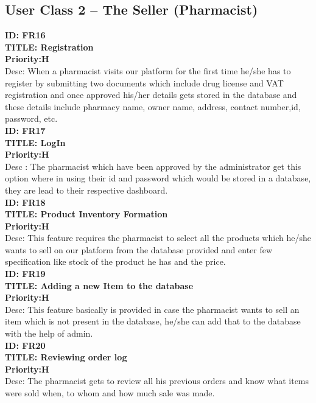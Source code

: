 \documentclass{scrreprt}
\begin{document}
\subsection{User Class 2 – The Seller (Pharmacist)}  

 
 \textbf{ID: FR16}\\
 \textbf{TITLE: Registration}\\
 \textbf{Priority:H}\\
Desc: When a pharmacist visits our platform for the first time he/she has to register by submitting two documents which include drug license and VAT registration and once approved his/her details gets stored in the database and these details include pharmacy name, owner name, address, contact number,id, password, etc.\\

 \textbf{ID: FR17}\\
 \textbf{TITLE: LogIn}\\
 \textbf{Priority:H}\\
Desc : The pharmacist which have been approved by the administrator get this option where in using their id and password which would be stored in a database, they are lead to their respective dashboard.\\

 \textbf{ID: FR18}\\
\textbf{TITLE: Product Inventory Formation}\\
 \textbf{Priority:H}\\
Desc: This feature requires the pharmacist to select all the products which he/she wants to sell on our platform from the database provided and enter few specification like stock of the product he has and the price.\\

 \textbf{ID: FR19}\\
 \textbf{TITLE: Adding a new Item to the database}\\
 \textbf{Priority:H}\\
Desc: This feature basically is provided in case the pharmacist wants to sell an item which is not present in the database, he/she can add that to the database with the help of admin.\\

 \textbf{ID: FR20}\\
 \textbf{TITLE: Reviewing order log}\\
 \textbf{Priority:H}\\
Desc: The pharmacist gets to review all his previous orders and know what items were sold when, to whom and how much sale was made.\\
\end{document}
